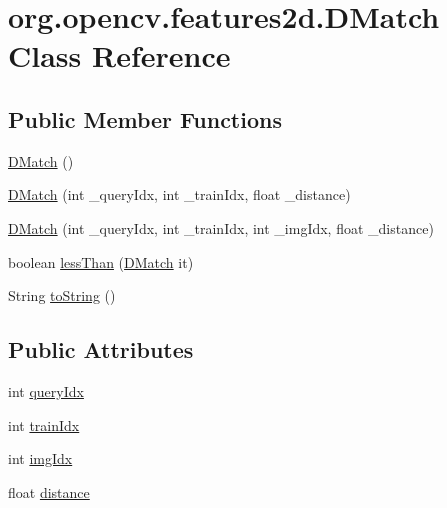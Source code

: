 \hypertarget{classorg_1_1opencv_1_1features2d_1_1_d_match}{}\section{org.\+opencv.\+features2d.\+D\+Match Class Reference}
\label{classorg_1_1opencv_1_1features2d_1_1_d_match}
\subsection*{Public Member Functions}
\begin{DoxyCompactItemize}
\item 
\mbox{\hyperlink{classorg_1_1opencv_1_1features2d_1_1_d_match_a3255866a2a9cdde50cee7159145fac42}{D\+Match}} ()
\item 
\mbox{\hyperlink{classorg_1_1opencv_1_1features2d_1_1_d_match_a813ac78e8774f83ebd543a7e69dd00a0}{D\+Match}} (int \+\_\+query\+Idx, int \+\_\+train\+Idx, float \+\_\+distance)
\item 
\mbox{\hyperlink{classorg_1_1opencv_1_1features2d_1_1_d_match_a8fbb9948d15914e3c6a4d9cb6bf934ed}{D\+Match}} (int \+\_\+query\+Idx, int \+\_\+train\+Idx, int \+\_\+img\+Idx, float \+\_\+distance)
\item 
boolean \mbox{\hyperlink{classorg_1_1opencv_1_1features2d_1_1_d_match_a9ae533290a571be96c8b10c268519121}{less\+Than}} (\mbox{\hyperlink{classorg_1_1opencv_1_1features2d_1_1_d_match}{D\+Match}} it)
\item 
String \mbox{\hyperlink{classorg_1_1opencv_1_1features2d_1_1_d_match_a074dbf6db18f7396d1342e34dd45d27c}{to\+String}} ()
\end{DoxyCompactItemize}
\subsection*{Public Attributes}
\begin{DoxyCompactItemize}
\item 
int \mbox{\hyperlink{classorg_1_1opencv_1_1features2d_1_1_d_match_aa4a4d90da8353c3bb5706f2f7fd8feb1}{query\+Idx}}
\item 
int \mbox{\hyperlink{classorg_1_1opencv_1_1features2d_1_1_d_match_a2fdbcba3ca1e7a7b0cb0eea023999a55}{train\+Idx}}
\item 
int \mbox{\hyperlink{classorg_1_1opencv_1_1features2d_1_1_d_match_add9d5db0bce6aecf8f6c8edf3097a1ec}{img\+Idx}}
\item 
float \mbox{\hyperlink{classorg_1_1opencv_1_1features2d_1_1_d_match_a6c97dbdc32824297beeb443617fd3d5d}{distance}}
\end{DoxyCompactItemize}


